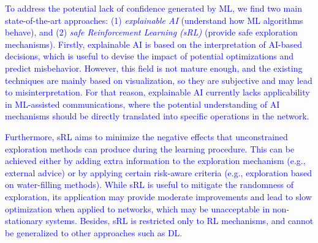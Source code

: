 \documentclass[journal]{IEEEtran}
\begin{document}
	\textcolor{blue}{To address the potential lack of confidence generated by ML, we find two main state-of-the-art approaches: (1) \textit{explainable AI} \cite{samek} (understand how ML algorithms behave), and (2) \textit{safe Reinforcement Learning (sRL)} \cite{safe} (provide safe exploration mechanisms). Firstly, explainable AI is based on the interpretation of AI-based decisions, which is useful to devise the impact of potential optimizations and predict misbehavior. However, this field is not mature enough, and the existing techniques are mainly based on visualization, so they are subjective and may lead to misinterpretation. For that reason, explainable AI currently lacks applicability in ML-assisted communications, where the potential understanding of AI mechanisms should be directly translated into specific operations in the network.}
		
	\textcolor{blue}{Furthermore, sRL aims to minimize the negative effects that unconstrained exploration methods can produce during the learning procedure. This can be achieved either by adding extra information to the exploration mechanism (e.g., external advice) or by applying certain risk-aware criteria (e.g., exploration based on water-filling methods). While sRL is useful to mitigate the randomness of exploration, its application may provide moderate improvements and lead to slow optimization when applied to networks, which may be unacceptable in non-stationary systems. Besides, sRL is restricted only to RL mechanisms, and cannot be generalized to other approaches such as DL.}
\end{document}
